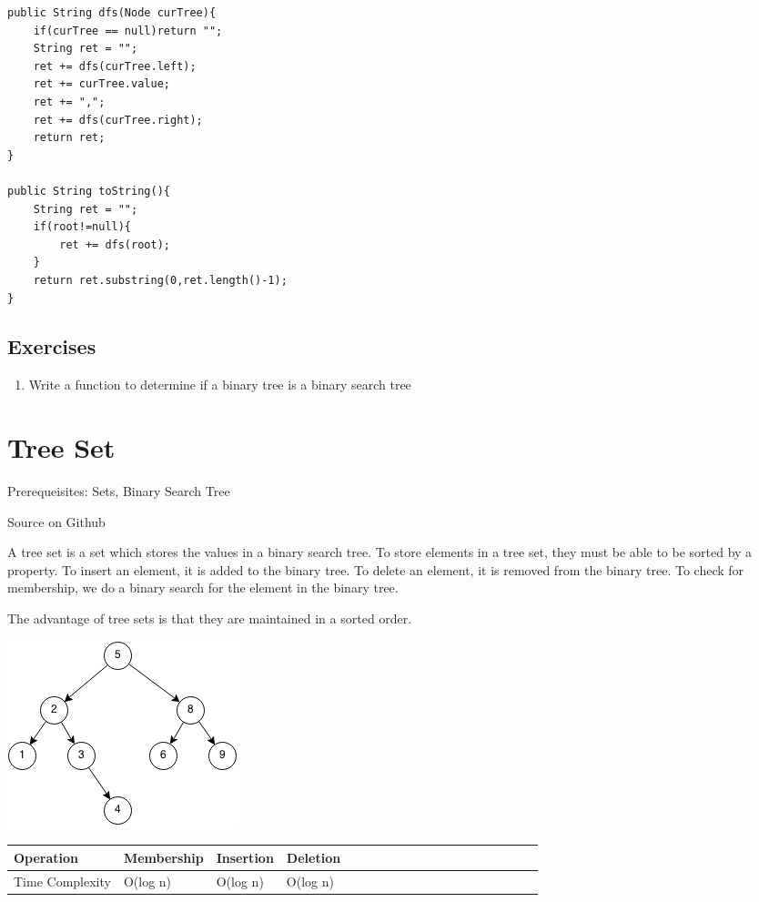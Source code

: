 \documentclass[11pt,oneside]{book}
\makeatletter
\def\maxwidth#1{\ifdim\Gin@nat@width>#1 #1\else\Gin@nat@width\fi}
\makeatother
\begin{document}
\begin{lstlisting}
public String dfs(Node curTree){
    if(curTree == null)return "";
    String ret = "";
    ret += dfs(curTree.left);
    ret += curTree.value;
    ret += ",";
    ret += dfs(curTree.right);
    return ret;
}
    
public String toString(){
    String ret = "";
    if(root!=null){
        ret += dfs(root);
    }
    return ret.substring(0,ret.length()-1);
}
\end{lstlisting}

\subsection{Exercises}

\begin{enumerate}
\item Write a function to determine if a binary tree is a binary search tree
\end{enumerate}

        \section{ Tree Set }
        

Prerequeisites: Sets, Binary Search Tree

Source on Github

A tree set is a set which stores the values in a binary search tree. To store elements in a tree set, they must be able to be sorted by a property. To insert an element, it is added to the binary tree. To delete an element, it is removed from the binary tree. To check for membership, we do a binary search for the element in the binary tree.

The advantage of tree sets is that they are maintained in a sorted order.

\includegraphics[width=\maxwidth{\textwidth}]{bst.png}

\vspace{10pt} \begin{tabulary}{0.4\linewidth}{|l|l|l|l|l|l|l|l|l|l|l|l|l|l|l|l|l|l|l}\hline


  Operation &
  Membership &
  Insertion &
  Deletion\\
\hline


  Time Complexity &
  O(log n) &
  O(log n) &
  O(log n)\\

\hline\end{tabulary}
\end{document}
